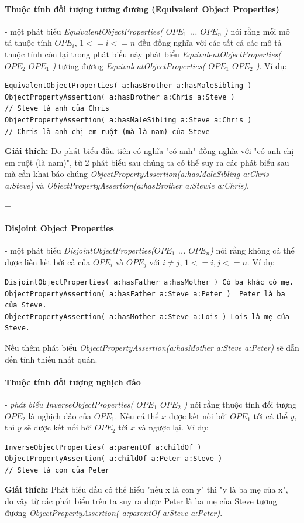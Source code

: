 \paragraph{Thuộc tính đối tượng tương đương (Equivalent Object Properties)} - một phát biểu \textit{EquivalentObjectProperties( $OPE_{1}$ ... $OPE_{n}$ )} nói rằng mỗi mô tả thuộc tính $OPE_{i}$, $1<=i<=n$ đều đồng nghĩa với các tất cả các mô tả thuộc tính còn lại trong phát biểu này phát biểu \textit{EquivalentObjectProperties( $OPE_{2}$ $OPE_{1}$ )} tương đương \textit{EquivalentObjectProperties( $OPE_{1}$ $OPE_{2}$ )}. Ví dụ:
\begin{verbatim}
EquivalentObjectProperties( a:hasBrother a:hasMaleSibling ) 
ObjectPropertyAssertion( a:hasBrother a:Chris a:Steve )     
// Steve là anh của Chris
ObjectPropertyAssertion( a:hasMaleSibling a:Steve a:Chris ) 
// Chris là anh chị em ruột (mà là nam) của Steve
\end{verbatim}
\textbf{Giải thích:} Do phát biểu đầu tiên có nghĩa "có anh" đồng nghĩa với "có anh chị em ruột (là nam)", từ 2 phát biểu sau chúng ta có thể suy ra các phát biểu sau mà cần khai báo chúng \textit{ObjectPropertyAssertion(a:hasMaleSibling a:Chris a:Steve)} và \textit{ObjectPropertyAssertion(a:hasBrother a:Stewie a:Chris)}.


+\paragraph{Disjoint Object Properties} - một phát biểu \textit{DisjointObjectProperties($OPE_{1}$ ... $OPE_{n}$)} nói rằng không cá thể được liên kết bởi cả của $OPE_{i}$ và $OPE_{j}$ với $i \neq j$, $1<=i,j<=n$. Ví dụ:

\begin{verbatim}
DisjointObjectProperties( a:hasFather a:hasMother ) Có ba khác có mẹ.
ObjectPropertyAssertion( a:hasFather a:Steve a:Peter )	Peter là ba của Steve.
ObjectPropertyAssertion( a:hasMother a:Steve a:Lois ) Lois là mẹ của Steve.
\end{verbatim}
Nếu thêm phát biểu \textit{ObjectPropertyAssertion(a:hasMother a:Steve a:Peter)} sẽ dẫn đến tính thiếu nhất quán.

\paragraph{Thuộc tính đối tượng nghịch đảo} - \textit{phát biểu InverseObjectProperties( $OPE_{1}$ $OPE_{2}$ )} nói rằng thuộc tính đối tượng $OPE_{2}$ là nghịch đảo của $OPE_{1}$. Nếu cá thể $x$ được kết nối bởi $OPE_{1}$ tới cá thể $y$, thì $y$ sẽ được kết nối bởi $OPE_{2}$ tới $x$ và ngược lại. Ví dụ:
\begin{verbatim}
InverseObjectProperties( a:parentOf a:childOf )
ObjectPropertyAssertion( a:childOf a:Peter a:Steve ) 
// Steve là con của Peter
\end{verbatim}
\textbf{Giải thích:} Phát biểu đầu có thể hiểu "nếu x là con y" thì "y là ba mẹ của x", do vậy từ các phát biểu trên ta suy ra được Peter là ba mẹ của Steve tương đương \textit{ObjectPropertyAssertion( a:parentOf a:Steve a:Peter)}.


